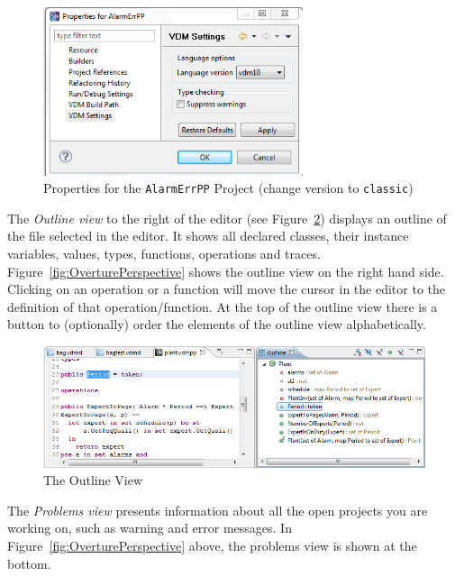 %
\begin{figure}[!htb]
\begin{center}
  \includegraphics[width=3.0in]{figures/settings}
  \caption[labelInTOC]{Properties for the \texttt{AlarmErrPP} Project (change version to \texttt{classic})}
  \label{fig:settings}
\end{center}
\end{figure}



The \emph{Outline view} to the right of the editor (see Figure~\ref{fig:OutlineView}) displays an outline of the file selected in the editor. It shows all declared classes, their instance variables, values, types, functions, operations and traces. Figure~\ref{fig:OverturePerspective} shows the outline view on the right hand side. Clicking on an operation or a function will move the cursor in the editor to the definition of that operation/function. At the top of the outline view there is a button to (optionally) order
the elements of the outline view alphabetically.
%
\begin{figure}[!htb]
\begin{center}
  \includegraphics[width=4.5in]{figures/OutlineView}
  \caption[labelInTOC]{The Outline View}
  \label{fig:OutlineView}
\end{center}
\end{figure}
%
The \emph{Problems view} presents information about all the open projects you are working on, such as warning and error messages. In Figure~\ref{fig:OverturePerspective} above, the problems view is shown at the bottom.

